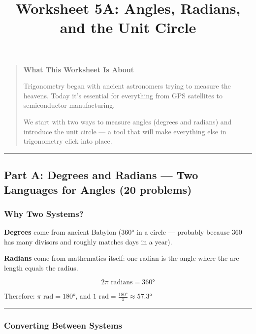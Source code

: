 \documentclass[
  11pt,
]{article}
\title{Worksheet 5A: Angles, Radians, and the Unit Circle}
\author{}
\date{}
\begin{document}
\maketitle

\begin{quote}
\textbf{What This Worksheet Is About}

Trigonometry began with ancient astronomers trying to measure the
heavens. Today it's essential for everything from GPS satellites to
semiconductor manufacturing.

We start with two ways to measure angles (degrees and radians) and
introduce the unit circle --- a tool that will make everything else in
trigonometry click into place.
\end{quote}

\begin{center}\rule{0.5\linewidth}{0.5pt}\end{center}

\hypertarget{part-a-degrees-and-radians-two-languages-for-angles-20-problems}{%
\subsection{Part A: Degrees and Radians --- Two Languages for Angles (20
problems)}\label{part-a-degrees-and-radians-two-languages-for-angles-20-problems}}

\hypertarget{why-two-systems}{%
\subsubsection{Why Two Systems?}\label{why-two-systems}}

\textbf{Degrees} come from ancient Babylon (360° in a circle ---
probably because 360 has many divisors and roughly matches days in a
year).

\textbf{Radians} come from mathematics itself: one radian is the angle
where the arc length equals the radius.

\[\boxed{2\pi \text{ radians} = 360°}\]

Therefore: \(\pi \text{ rad} = 180°\), and
\(1 \text{ rad} = \frac{180°}{\pi} \approx 57.3°\)

\begin{center}\rule{0.5\linewidth}{0.5pt}\end{center}

\hypertarget{converting-between-systems}{%
\subsubsection{Converting Between
Systems}\label{converting-between-systems}}
\end{document}

